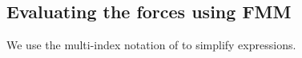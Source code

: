 \subsection{Evaluating the forces using FMM}
\label{ssec:fmm_summary}

We use the multi-index notation of \cite{Dehnen2014} to simplify expressions.



